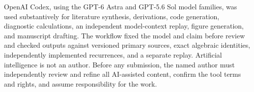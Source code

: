 \documentclass[aps,pra,reprint,superscriptaddress,longbibliography,nofootinbib]{revtex4-2}
\begin{document}
OpenAI Codex, using the GPT-6 Astra and GPT-5.6 Sol model families, was used
substantively for literature synthesis, derivations, code generation,
diagnostic calculations, an independent model-context replay, figure
generation, and manuscript drafting.  The workflow fixed the model and claim
before review and checked outputs against versioned primary sources, exact
algebraic identities, independently implemented recurrences, and a separate
replay.  Artificial intelligence is not an author.  Before any submission,
the named author must independently review and refine all AI-assisted content,
confirm the tool terms and rights, and assume responsibility for the work.


\end{document}

